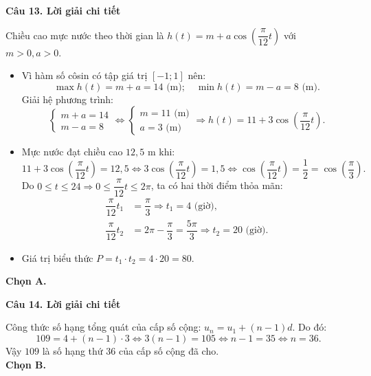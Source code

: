 \documentclass[12pt, a4paper]{article}
\begin{document}
\noindent\textbf{Câu 13. Lời giải chi tiết}\par
\begin{tcolorbox}[enhanced,breakable,colback=solutionbg,colframe=secondary!50!black,frame hidden,borderline west={3pt}{0pt}{secondary!50!black}]
Chiều cao mực nước theo thời gian là $h(t) = m + a\cos\left(\dfrac{\pi}{12}t\right)$ với $m > 0, a > 0$.
\begin{itemize}[leftmargin=1.5em]
\item Vì hàm số côsin có tập giá trị $[-1; 1]$ nên:
$$\max h(t) = m + a = 14\text{ (m)};\quad \min h(t) = m - a = 8\text{ (m)}.$$
Giải hệ phương trình:
$$\begin{cases} m + a = 14 \\ m - a = 8 \end{cases} \Leftrightarrow \begin{cases} m = 11\text{ (m)} \\ a = 3\text{ (m)} \end{cases} \Rightarrow h(t) = 11 + 3\cos\left(\dfrac{\pi}{12}t\right).$$

\item Mực nước đạt chiều cao $12{,}5\text{ m}$ khi:
$$11 + 3\cos\left(\dfrac{\pi}{12}t\right) = 12{,}5 \Leftrightarrow 3\cos\left(\dfrac{\pi}{12}t\right) = 1{,}5 \Leftrightarrow \cos\left(\dfrac{\pi}{12}t\right) = \dfrac{1}{2} = \cos\left(\dfrac{\pi}{3}\right).$$
Do $0 \le t \le 24 \Rightarrow 0 \le \dfrac{\pi}{12}t \le 2\pi$, ta có hai thời điểm thỏa mãn:
$$\begin{aligned}
\dfrac{\pi}{12}t_1 &= \dfrac{\pi}{3} \Rightarrow t_1 = 4\text{ (giờ)},\\
\dfrac{\pi}{12}t_2 &= 2\pi - \dfrac{\pi}{3} = \dfrac{5\pi}{3} \Rightarrow t_2 = 20\text{ (giờ)}.
\end{aligned}$$
\item Giá trị biểu thức $P = t_1 \cdot t_2 = 4 \cdot 20 = 80$.
\end{itemize}
\textbf{Chọn A.}
\end{tcolorbox}

\noindent\textbf{Câu 14. Lời giải chi tiết}\par
\begin{tcolorbox}[enhanced,breakable,colback=solutionbg,colframe=secondary!50!black,frame hidden,borderline west={3pt}{0pt}{secondary!50!black}]
Công thức số hạng tổng quát của cấp số cộng: $u_n = u_1 + (n - 1)d$. Do đó:
$$109 = 4 + (n - 1)\cdot 3 \Leftrightarrow 3(n - 1) = 105 \Leftrightarrow n - 1 = 35 \Leftrightarrow n = 36.$$
Vậy $109$ là số hạng thứ $36$ của cấp số cộng đã cho.\\
\textbf{Chọn B.}
\end{tcolorbox}
\end{document}
